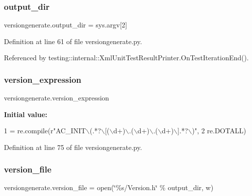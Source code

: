 \mbox{\label{namespaceversiongenerate_aab714e0aa9036025ba7c83eb7422c567}} 
\subsubsection{\texorpdfstring{output\+\_\+dir}{output\_dir}}
{\footnotesize\ttfamily versiongenerate.\+output\+\_\+dir = sys.\+argv\mbox{[}2\mbox{]}}



Definition at line 61 of file versiongenerate.\+py.



Referenced by testing\+::internal\+::\+Xml\+Unit\+Test\+Result\+Printer.\+On\+Test\+Iteration\+End().

\mbox{\label{namespaceversiongenerate_a83861e707250395976fdfee3396a0fff}} 
\subsubsection{\texorpdfstring{version\+\_\+expression}{version\_expression}}
{\footnotesize\ttfamily versiongenerate.\+version\+\_\+expression}

{\bfseries Initial value\+:}
\begin{DoxyCode}
1 =  re.compile(\textcolor{stringliteral}{r"AC\_INIT\(\backslash\)(.*?\(\backslash\)[(\(\backslash\)d+)\(\backslash\).(\(\backslash\)d+)\(\backslash\).(\(\backslash\)d+)\(\backslash\)].*?\(\backslash\))"},
2                                 re.DOTALL)
\end{DoxyCode}


Definition at line 75 of file versiongenerate.\+py.

\mbox{\label{namespaceversiongenerate_a3cb3deeb1538014cd32e4253fe298e27}} 
\subsubsection{\texorpdfstring{version\+\_\+file}{version\_file}}
{\footnotesize\ttfamily versiongenerate.\+version\+\_\+file = open(\char`\"{}\%s/Version.\+h\char`\"{} \% output\+\_\+dir, \textquotesingle{}w\textquotesingle{})}



